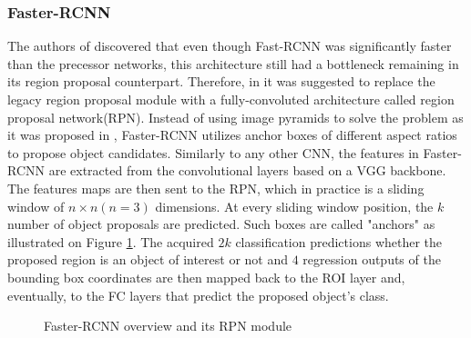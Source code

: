 \documentclass[english, 12pt, a4paper, elec, utf8, a-1b, online]{aaltothesis}
\begin{document}
\subsubsection{Faster-RCNN} 
The authors of \cite{ima} discovered that even though Fast-RCNN was significantly faster than the precessor networks, this architecture still had a bottleneck remaining in its region proposal counterpart. Therefore, in \cite{ima} it was suggested to replace the legacy region proposal module with a fully-convoluted architecture called region proposal network(RPN)\cite{Girshick2013}. Instead of using image pyramids to solve the problem as it was proposed in \cite{Girshick2015}, Faster-RCNN \cite{ima} utilizes anchor boxes of different aspect ratios to propose object candidates. Similarly to any other CNN, the features in Faster-RCNN are extracted from the convolutional layers based on a VGG backbone. The features maps are then sent to the RPN, which in practice is a sliding window  of $n\times n (n=3)$ dimensions. At every sliding window position, the $k$ number of object proposals are predicted. Such boxes are called "anchors" as illustrated on Figure \ref{fig:faster_rcnn}. The acquired $2k$ classification predictions whether the proposed region is an object of interest or not and $4$ regression outputs of the bounding box coordinates are then mapped back to the ROI layer and, eventually, to the FC layers that predict the proposed object's class. \cite{ima}


\begin{figure}[htb]
    \centering
    \qquad
    \caption{Faster-RCNN overview and its RPN module}\cite{ima}
    \label{fig:faster_rcnn}%
\end{figure}
\FloatBarrier
\end{document}
